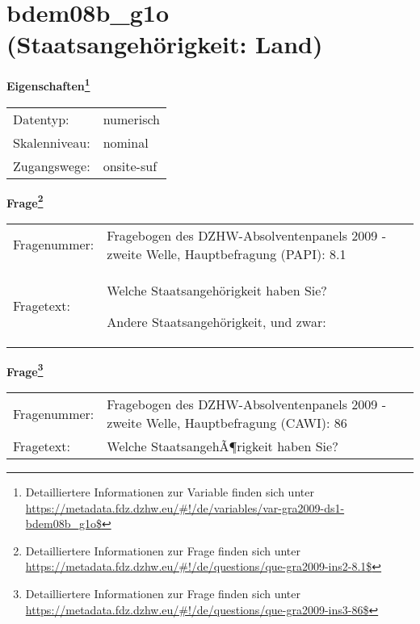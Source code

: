 
    \setcounter{footnote}{0}

    \vspace*{-1.8cm}
	\section{bdem08b\_g1o (Staatsangehörigkeit: Land)}
	\label{section:bdem08b_g1o}



    \vspace*{0.5cm}
    \noindent\textbf{Eigenschaften\footnote{Detailliertere Informationen zur Variable finden sich unter
		\url{https://metadata.fdz.dzhw.eu/\#!/de/variables/var-gra2009-ds1-bdem08b_g1o$}}}\\
	\begin{tabularx}{\hsize}{@{}lX}
	Datentyp: & numerisch \\
	Skalenniveau: & nominal \\
	Zugangswege: &
	  onsite-suf
 \\
    \end{tabularx}



				\vspace*{0.5cm}
                \noindent\textbf{Frage\footnote{Detailliertere Informationen zur Frage finden sich unter
		              \url{https://metadata.fdz.dzhw.eu/\#!/de/questions/que-gra2009-ins2-8.1$}}}\\
				\begin{tabularx}{\hsize}{@{}lX}
					Fragenummer: &
					  Fragebogen des DZHW-Absolventenpanels 2009 - zweite Welle, Hauptbefragung (PAPI):
					  8.1
 \\
					Fragetext: & Welche Staatsangehörigkeit haben Sie?\par  Andere Staatsangehörigkeit, und zwar: \\
				\end{tabularx}
				\vspace*{0.5cm}
                \noindent\textbf{Frage\footnote{Detailliertere Informationen zur Frage finden sich unter
		              \url{https://metadata.fdz.dzhw.eu/\#!/de/questions/que-gra2009-ins3-86$}}}\\
				\begin{tabularx}{\hsize}{@{}lX}
					Fragenummer: &
					  Fragebogen des DZHW-Absolventenpanels 2009 - zweite Welle, Hauptbefragung (CAWI):
					  86
 \\
					Fragetext: & Welche StaatsangehÃ¶rigkeit haben Sie? \\
				\end{tabularx}






